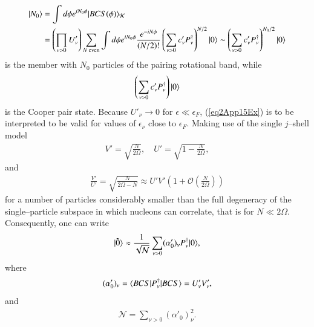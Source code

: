\begin{subappendices}
\begin{align}
\nonumber|{N_0} \rangle&=\int d\phi e^{iN_0\phi}|{BCS(\phi)} \rangle_{\mathcal K}\\
&=\left(\prod_{\nu>0}U'_\nu\right)\sum_{N \text{ even}}\int d\phi e^{iN_0\phi}\frac{e^{-iN\phi}}{(N/2)!}\left(\sum_{\nu>0}c'_\nu P_\nu^\dagger\right)^{N/2}|{0} \rangle\sim\left(\sum_{\nu>0}c'_\nu P_\nu^\dagger\right)^{N_0/2}|{0} \rangle
\end{align}
is the member with $N_0$ particles of the pairing rotational band, while
\begin{align}\label{eq2App15Ex}
\left(\sum_{\nu>0}c'_\nu P_\nu^\dagger\right)|{0} \rangle
\end{align}
is the Cooper pair state. Because $U'_\nu\to 0$ for $\epsilon\ll \epsilon_F$, (\ref{eq2App15Ex}) is to be interpreted to be valid for values of $\epsilon_\nu$ close to $\epsilon_F$.
Making use of the single $j$--shell model
\begin{align}\label{eq2App16Ex}
V'=\sqrt{\frac{N}{2\Omega}},\quad U'=\sqrt{1-\frac{N}{2\Omega}},
\end{align}
and
\begin{align}\label{eq2App17Ex}
\frac{V'}{U'}=\sqrt{\frac{N}{2\Omega-N}}\approx U'V'\left(1+\mathcal O\left(\frac{N}{2\Omega}\right)\right)
\end{align}
for a number of particles considerably smaller than the full degeneracy of the single--particle subspace in which nucleons can correlate, that is for $N\ll2\Omega$. Consequently, one can write
\begin{align}\label{eq2App18Ex}
|{\tilde 0} \rangle\approx\frac{1}{\sqrt{\mathcal N}}\sum_{\nu>0}(\alpha'_0)_\nu P^\dagger_\nu|{0} \rangle,
\end{align}
where
\begin{align}\label{eq2App19Ex}
(\alpha'_0)_\nu =\langle {BCS|P^\dagger_\nu|BCS} \rangle=U'_\nu V'_\nu,
\end{align}
and
\begin{align}\label{eq2App20Ex}
\mathcal N=\sum_{\nu>0}(\alpha'_0)_\nu^2.
\end{align}











\end{subappendices}















% 
%
